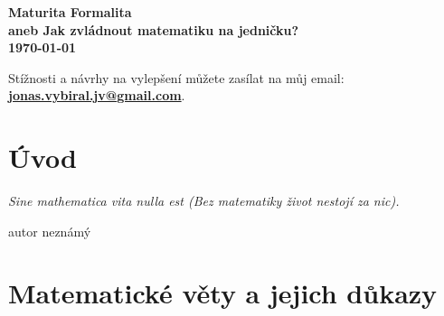 \documentclass[a4paper, openany]{book}
\newcommand{\mathquote}[2]{%
    \begin{flushright}
    \begin{minipage}[t]{0.5\textwidth} %
    \textit{#1}

    \raggedleft#2
    \end{minipage}
    \end{flushright}%
    \vspace{0.3cm}%
}
\begin{document}
\begin{titlepage}
  \centering
  \vspace*{2cm}
  
  \textbf{\Huge Maturita Formalita}\\[0.5cm]
  
  \textbf{\Large aneb Jak zvládnout matematiku na jedničku?}\\[1.5cm]
  
  \textbf{\Large \today}

  \vfill
  Stížnosti a návrhy na vylepšení můžete zasílat na můj email: \\[0.5cm]
  \textbf{\href{mailto: jonas.vybiral.jv@gmail.com}{jonas.vybiral.jv@gmail.com}}.
\end{titlepage}

\thispagestyle{empty}

\tableofcontents

\chapter*{Úvod}
\mathquote{Sine mathematica vita nulla est (Bez matematiky život nestojí za nic).}{autor neznámý}


\chapter{Matematické věty a jejich důkazy}

\end{document}

